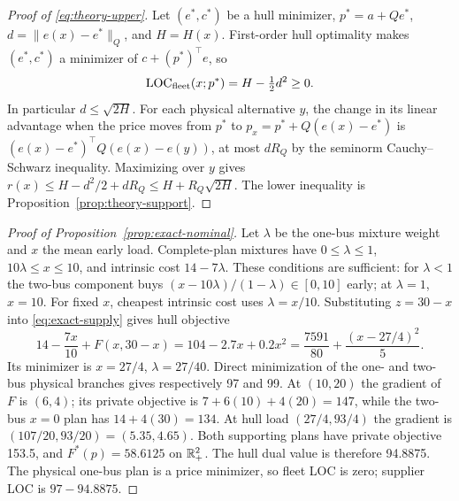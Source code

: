 \begin{proof}[Proof of \eqref{eq:theory-upper}]
Let $(e^*,c^*)$ be a hull minimizer, $p^*=a+Qe^*$,
$d=\|e(x)-e^*\|_Q$, and $H=H(x)$.  First-order hull optimality makes
$(e^*,c^*)$ a minimizer of $c+(p^*)^\top e$, so
\[
 \mathrm{LOC}_{\rm fleet}(x;p^*)=H-\tfrac12d^2\geq0.
\]
In particular $d\leq\sqrt{2H}$.  For each physical alternative $y$,
the change in its linear advantage when the price moves from $p^*$ to
$p_x=p^*+Q(e(x)-e^*)$ is
$(e(x)-e^*)^\top Q(e(x)-e(y))$, at most $dR_Q$ by
the seminorm Cauchy--Schwarz inequality.  Maximizing over $y$ gives
$r(x)\leq H-d^2/2+dR_Q\leq H+R_Q\sqrt{2H}$.
The lower inequality is Proposition~\ref{prop:theory-support}.
\end{proof}

\begin{proof}[Proof of Proposition~\ref{prop:exact-nominal}]
Let $\lambda$ be the one-bus mixture weight and $x$ the mean early load.
Complete-plan mixtures have $0\leq\lambda\leq1$,
$10\lambda\leq x\leq10$, and intrinsic cost $14-7\lambda$.
These conditions are sufficient: for $\lambda<1$ the two-bus component
buys $(x-10\lambda)/(1-\lambda)\in[0,10]$ early; at $\lambda=1$,
$x=10$.  For fixed $x$, cheapest intrinsic cost uses
$\lambda=x/10$.  Substituting $z=30-x$ into \eqref{eq:exact-supply}
gives hull objective
\[
 14-\frac{7x}{10}+F(x,30-x)
 =104-2.7x+0.2x^2
 =\frac{7591}{80}+\frac{(x-27/4)^2}{5}.
\]
Its minimizer is $x=27/4$, $\lambda=27/40$.  Direct minimization of
the one- and two-bus physical branches gives respectively 97 and 99.
At $(10,20)$ the gradient of $F$ is $(6,4)$; its private objective is
$7+6(10)+4(20)=147$, while the two-bus $x=0$ plan has
$14+4(30)=134$.  At hull load $(27/4,93/4)$ the gradient is
$(107/20,93/20)=(5.35,4.65)$.  Both supporting plans have private
objective 153.5, and $F^*(p)=58.6125$ on $\mathbb R_+^2$.
The hull dual value is therefore 94.8875.  The physical one-bus plan is
a price minimizer, so fleet LOC is zero; supplier LOC is $97-94.8875$.
\end{proof}


